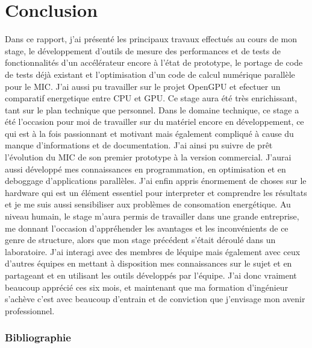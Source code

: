 \documentclass[11pt]{article}
\begin{document}
\part{Conclusion}
Dans ce rapport, j'ai présenté les principaux travaux effectués au cours de mon stage, le développement d'outils de mesure des 
performances et de tests de fonctionnalités d'un accélérateur encore à l'état de prototype, le portage de code de tests déjà 
existant et l'optimisation d'un code de calcul numérique parallèle pour le MIC. J'ai aussi pu travailler sur le projet OpenGPU 
et efectuer un comparatif energetique entre CPU et GPU. Ce stage aura été très enrichissant, tant sur le plan 
technique que personnel. \newline
\newline
Dans le domaine technique, ce stage a été l'occasion pour moi de travailler sur du matériel encore en développement, ce qui est 
à la fois passionnant et motivant mais également compliqué à cause du manque d'informations et de documentation. J'ai ainsi pu 
suivre de prêt l'évolution du MIC de son premier prototype à la version commercial. J'aurai aussi développé mes connaissances en 
programmation, en optimisation et en deboggage d'applications parallèles. J'ai enfin appris énormement de choses sur le hardware 
qui est un élément essentiel pour interpreter et comprendre les résultats et je me suis aussi sensibiliser aux problèmes de consomation 
energétique. \newline
\newline
Au niveau humain, le stage m'aura permis de travailler dans une grande entreprise, me donnant l'occasion
d'appréhender les avantages et les inconvénients de ce genre de structure, alors que mon stage précédent s'était déroulé dans 
un laboratoire. J'ai interagi avec des membres de léquipe mais également avec ceux d'autres équipes en mettant à disposition 
mes connaissances sur le sujet et en partageant et en utilisant les outils développés par l'équipe. \newline
\newline
J'ai donc vraiment beaucoup apprécié ces six mois, et maintenant que ma formation d'ingénieur
s'achève c'est avec beaucoup d'entrain et de conviction que j'envisage mon avenir professionnel.

\newpage
{}
\appendix
\section{Bibliographie}
\end{document}
